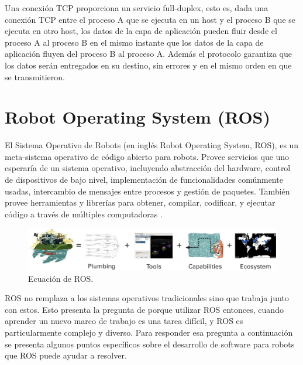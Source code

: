 \documentclass[withindex,glossary]{cam-thesis}
\begin{document}
Una conexión TCP proporciona un servicio full-duplex, esto es, dada una conexión TCP entre el proceso A que se ejecuta en un host y el proceso B que se ejecuta en otro host, los datos de la capa de aplicación pueden fluir desde el proceso A al proceso B en el mismo instante que los datos de la capa de aplicación fluyen del proceso B al proceso A. Además el protocolo garantiza que los datos serán entregados en su destino, sin errores y en el mismo orden en que se transmitieron.

\section{Robot Operating System (ROS)} \label{sec: Marco Teórico - ROS}
El Sistema Operativo de Robots (en inglés Robot Operating System, ROS), es un meta-sistema operativo de código abierto para robots. Provee servicios que uno esperaría de un sistema operativo, incluyendo abstracción del hardware, control de dispositivos de bajo nivel, implementación de funcionalidades comúnmente usadas, intercambio de mensajes entre procesos y gestión de paquetes. También provee herramientas y librerías para obtener, compilar, codificar, y ejecutar código a través de múltiples computadoras \cite{wikiROS}.

\begin{figure}[H]
  \centering
  \includegraphics[width=\textwidth]{images/ros_equation}
  \caption[Ecuación de ROS]{Ecuación de ROS.}
\end{figure}

ROS no remplaza a los sistemas operativos tradicionales sino que trabaja junto con estos. Esto presenta la pregunta de porque utilizar ROS entonces, cuando aprender un nuevo marco de trabajo es una tarea difícil, y ROS es particularmente complejo y diverso. Para responder esa pregunta a continuación se presenta algunos puntos específicos sobre el desarrollo de software para robots que ROS puede ayudar a resolver.
\end{document}
